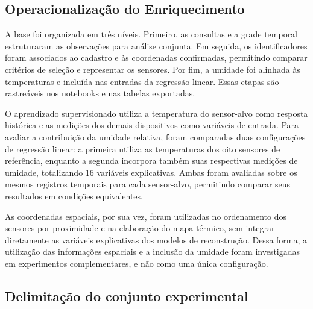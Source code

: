\subsection{Operacionalização do Enriquecimento}
\label{subsec:operacionalizacao_enriquecimento}

A base foi organizada em três níveis. Primeiro, as consultas e a grade
temporal estruturaram as observações para análise conjunta. Em seguida,
os identificadores foram associados ao cadastro e às coordenadas
confirmadas, permitindo comparar critérios de seleção e representar
os sensores. Por fim, a umidade foi alinhada às temperaturas e incluída
nas entradas da regressão linear. Essas etapas são rastreáveis nos
notebooks e nas tabelas exportadas.


O aprendizado supervisionado utiliza a temperatura do sensor-alvo como resposta histórica e as medições dos demais dispositivos como variáveis de entrada. Para avaliar a contribuição da umidade relativa, foram comparadas duas configurações de regressão linear: a primeira utiliza as temperaturas dos oito sensores de referência, enquanto a segunda incorpora também suas respectivas medições de umidade, totalizando 16 variáveis explicativas. Ambas foram avaliadas sobre os mesmos registros temporais para cada sensor-alvo, permitindo comparar seus resultados em condições equivalentes.

As coordenadas espaciais, por sua vez, foram utilizadas no ordenamento dos sensores por proximidade e na elaboração do mapa térmico, sem integrar diretamente as variáveis explicativas dos modelos de reconstrução. Dessa forma, a utilização das informações espaciais e a inclusão da umidade foram investigadas em experimentos complementares, e não como uma única configuração.


\subsection{Delimitação do conjunto experimental}
\label{subsec:conjunto_experimental}

